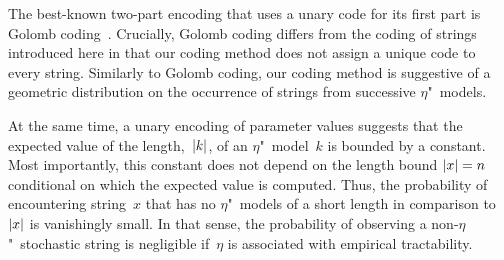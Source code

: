 The best-known two-part encoding that uses a unary code for its first part is Golomb coding~\parencite{golomb1966run-length,sayood2017introduction}.
Crucially, Golomb coding differs from the coding of strings introduced here in that our coding method does not assign a unique code to every string.
Similarly to Golomb coding, our coding method is suggestive of a geometric distribution on the occurrence of strings from successive $\eta$"~models.

At the same time, a unary encoding of parameter values suggests that the expected value of the length,~${\lvert k\rvert}$, of an $\eta$"~model~$k$ is bounded by a constant.
Most importantly, this constant does not depend on the length bound ${\lvert x\rvert} = n$ conditional on which the expected value is computed.
Thus, the probability of encountering string~$x$ that has no $\eta$"~models of a short length in comparison to~${\lvert x\rvert}$ is vanishingly small.
In that sense, the probability of observing a non-$\eta$"~stochastic string is negligible if~$\eta$ is associated with empirical tractability.
\slogan[\label{slo:expected}]{The expected parameter value is small.}

